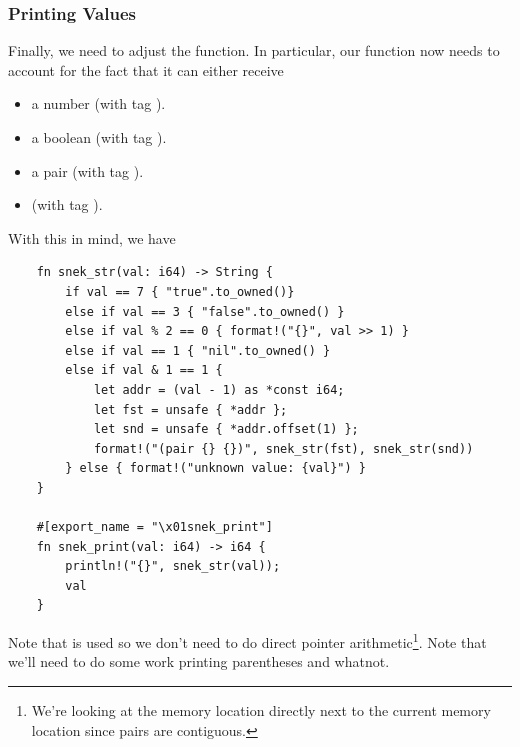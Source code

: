 \documentclass[letterpaper]{article}
\begin{document}
\subsubsection{Printing Values}
Finally, we need to adjust the  function. In particular, our function now needs to account for the fact that it can either receive 
\begin{itemize}
    \item a number (with tag ).
    \item a boolean (with tag ).
    \item a pair (with tag ).
    \item {} (with tag ).
\end{itemize}
With this in mind, we have 
\begin{verbatim}
    fn snek_str(val: i64) -> String {
        if val == 7 { "true".to_owned()} 
        else if val == 3 { "false".to_owned() } 
        else if val % 2 == 0 { format!("{}", val >> 1) } 
        else if val == 1 { "nil".to_owned() } 
        else if val & 1 == 1 {
            let addr = (val - 1) as *const i64; 
            let fst = unsafe { *addr };
            let snd = unsafe { *addr.offset(1) };
            format!("(pair {} {})", snek_str(fst), snek_str(snd))
        } else { format!("unknown value: {val}") }
    }

    #[export_name = "\x01snek_print"]
    fn snek_print(val: i64) -> i64 {
        println!("{}", snek_str(val));
        val 
    }\end{verbatim}
Note that  is used so we don't need to do direct pointer arithmetic\footnote{We're looking at the memory location directly next to the current memory location since pairs are contiguous.}. Note that we'll need to do some work printing parentheses and whatnot.
\end{document}
